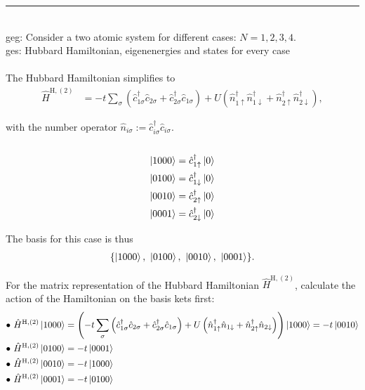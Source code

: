 \documentclass{article}
\newcommand{\lr}[1]{\left(#1\right)}
\begin{document}
{\color{blue}
\hrule
	\\
	geg: Consider a two atomic system for different cases: $N=1,2,3,4$.\\
	ges: Hubbard Hamiltonian, eigenenergies and states for every case\\
	\\
	The Hubbard Hamiltonian simplifies to
		\begin{align*}
			\hat{H}^{\text{H},{(2)}} &= -t \sum_\sigma \lr{ \hat{c}_{1\sigma}^\dagger \hat{c}_{2\sigma} + \hat{c}_{2\sigma}^\dagger \hat{c}_{1\sigma} } + U \lr{ \hat{n}_{1\uparrow}^\dagger \hat{n}_{1\downarrow}^\dagger + \hat{n}_{2\uparrow}^\dagger \hat{n}_{2\downarrow}^\dagger },
		\end{align*}
	
	with the number operator $\hat{n}_{i\sigma} := \hat{c}_{i\sigma}^\dagger \hat{c}_{i\sigma}$.\\
	\\
		\begin{align*}
			\ket{1000} &= \hat{c}_{1\uparrow}^\dagger \ket{0} \\
			\ket{0100} &= \hat{c}_{1\downarrow}^\dagger \ket{0} \\
			\ket{0010} &= \hat{c}_{2\uparrow}^\dagger \ket{0} \\
			\ket{0001} &= \hat{c}_{2\downarrow}^\dagger \ket{0}
		\end{align*}
	
	The basis for this case is thus
		\begin{align*}
			\{ \ket{1000},\ \ket{0100},\ \ket{0010},\  \ket{0001} \}.
		\end{align*}
	
	For the matrix representation of the Hubbard Hamiltonian $\hat{H}^{\text{H},{(2)}}$, calculate the action of the Hamiltonian on the basis kets first:
		\begin{align*}
			\bullet \ \hat{H}^{\text{H},{(2)}} \ket{1000} &= \lr{ -t \sum_\sigma \lr{ \hat{c}_{1\sigma}^\dagger \hat{c}_{2\sigma} + \hat{c}_{2\sigma}^\dagger \hat{c}_{1\sigma} } + U \lr{ \hat{n}_{1\uparrow}^\dagger \hat{n}_{1\downarrow} + \hat{n}_{2\uparrow}^\dagger \hat{n}_{2\downarrow} } } \ket{1000} = -t \ket{0010} \\
			\bullet \ \hat{H}^{\text{H},{(2)}} \ket{0100} &= -t \ket{0001} \\
			\bullet \ \hat{H}^{\text{H},{(2)}} \ket{0010} &= -t \ket{1000} \\
			\bullet \ \hat{H}^{\text{H},{(2)}} \ket{0001} &= -t \ket{0100}
		\end{align*}

}
\end{document}
